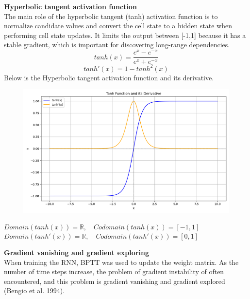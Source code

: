 \documentclass[12pt,a4paper]{article}
\begin{document}
\newpage
\textbf{Hyperbolic tangent activation function}\\
The main role of the hyperbolic tangent (tanh) activation function is to normalize candidate values and convert the cell state to a hidden state when performing cell state updates. It limits the output between [-1,1] because it has a stable gradient, which is important for discovering long-range dependencies.
\newline
\begin{equation}
    tanh(x) = \frac{ e^{x} - e^{-x} }{e^{x} + e^{-x}}
\end{equation}
\begin{equation}
    tanh'(x) = 1 - tanh^{2}(x)
\end{equation}
Below is the Hyperbolic tangent activation function and its derivative.\\
\begin{figure}[!htb]
    \centering
    \includegraphics[width=1\textwidth]{./Pic/tanh.png} %
    \label{fig:tanh}
\end{figure}
\newline
$Domain(tanh(x))=\mathbb{R},\hspace{1em} Codomain(tanh(x))=[-1,1]$\\
$Domain(tanh'(x))=\mathbb{R},\hspace{1em} Codomain(tanh'(x))=[0,1]$

\newpage
\textbf{Gradient vanishing and gradient exploring}\\
When training the RNN, BPTT was used to update the weight matrix. As the number of time steps increase, the problem of gradient instability of often encountered, and this problem is gradient vanishing and gradient explored (Bengio et al. 1994). 
\end{document}
